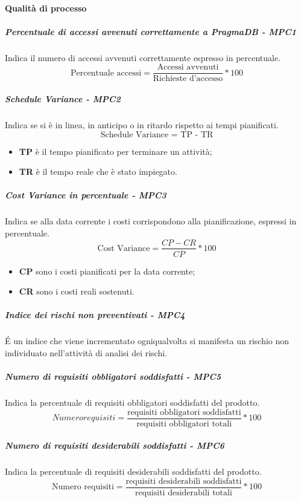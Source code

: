 \paragraph{Qualità di processo}
\subparagraph{Percentuale di accessi avvenuti correttamente a PragmaDB - MPC1}
Indica il numero  di accessi avvenuti correttamente espresso in percentuale.\\
\begin{equation*}
\text{Percentuale accessi} = \frac{\text{Accessi avvenuti}}{\text{Richieste d'accesso}} * 100
\end{equation*}
\subparagraph{Schedule Variance - MPC2}
Indica se si è in linea, in anticipo o in ritardo rispetto ai tempi pianificati.\\
\begin{equation*}
\text{Schedule Variance = TP - TR}
\end{equation*}
\begin{itemize}
	\item \textbf{TP} è il tempo pianificato per terminare un attività;
	\item \textbf{TR} è il tempo reale che è stato impiegato.
\end{itemize}
\subparagraph{Cost Variance in percentuale - MPC3}
Indica se alla data corrente i costi corrispondono alla pianificazione, espressi in percentuale.
\begin{equation*}
\text{Cost Variance} = \frac{CP - CR}{CP} * 100
\end{equation*}
\begin{itemize}
	\item \textbf{CP} sono i costi pianificati per la data corrente;
	\item \textbf{CR} sono i costi reali sostenuti.
\end{itemize}
\subparagraph{Indice dei rischi non preventivati - MPC4}
É un indice che viene incrementato ogniqualvolta si manifesta un rischio non individuato nell'attività di analisi dei rischi.
\subparagraph{Numero di requisiti obbligatori soddisfatti - MPC5}
Indica la percentuale di requisiti obbligatori soddisfatti del prodotto.
\begin{equation*}
Numero requisiti = \frac{\text{requisiti obbligatori soddisfatti}}{\text{requisiti obbligatori totali}} * 100
\end{equation*}
\subparagraph{Numero di requisiti desiderabili soddisfatti - MPC6}
Indica la percentuale di requisiti desiderabili soddisfatti del prodotto.
\begin{equation*}
\text{Numero requisiti} = \frac{\text{requisiti desiderabili soddisfatti}}{\text{requisiti desiderabili totali}} * 100
\end{equation*}
